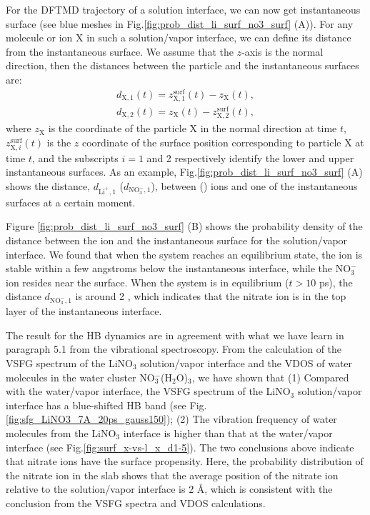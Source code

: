 For the DFTMD trajectory of a solution interface, we can now get instantaneous surface (see blue meshes in Fig.\thinspace\ref{fig:prob_dist_li_surf_no3_surf} (A)).
For any molecule or ion X in such a solution/vapor interface, we can define its distance from the instantaneous surface.
We assume that the $z$-axis is the normal direction, then the distances between the particle and the instantaneous surfaces are:
%
\begin{eqnarray}
    d_{\text{X},1}(t)=  z^\text{surf}_{\text{X},1}(t) - z_{\text{X}}(t),\label{eq:distance_particle2surf_1}\\
    d_{\text{X},2}(t)= z_{\text{X}}(t) - z^\text{surf}_{\text{X},2}(t), 
\label{eq:distance_particle2surf_2}
\end{eqnarray}
%
where $z_{\text{X}}$ is the coordinate of the particle X in the normal direction at time $t$, 
$z^\text{surf}_{\text{X},i}(t)$ is the $z$ coordinate of the surface position corresponding to particle X at time $t$, 
and the subscripts $i=1$ and 2 respectively identify the lower and upper instantaneous surfaces.
As an example, Fig.\thinspace\ref{fig:prob_dist_li_surf_no3_surf} (A) shows the distance, 
$d_{\text{Li}^+,1}$ ($d_{\text{NO}_3^-,1}$), between \Li (\nitrate) ions and one of the instantaneous surfaces at a certain moment.

Figure \ref{fig:prob_dist_li_surf_no3_surf} (B) shows the probability density of the distance between the ion 
and the instantaneous surface for the \LiN solution/vapor interface. We found that when the system reaches an equilibrium state, 
the \Li ion is stable within a few angstroms below the instantaneous interface, while the NO$^-_3$ ion resides near the surface. 
When the system is in equilibrium ($t>10$ ps), the distance $d_{\text{NO}_3^-,1}$ is around 2 \A, 
which indicates that the nitrate ion is in the top layer of the instantaneous interface. 

The result for the HB dynamics are in agreement with what we have learn in paragraph 5.1 
from the vibrational spectroscopy.
From the calculation of the VSFG spectrum of the LiNO$_3$ solution/vapor interface and the VDOS of water molecules in the water cluster NO$^-_3$(H$_2$O)$_3$,
we have shown that (1) Compared with the water/vapor interface, the VSFG spectrum of the LiNO$_3$ solution/vapor interface has a blue-shifted HB band 
(see Fig.\thinspace\ref{fig:sfg_LiNO3_7A_20ps_gauss150});
(2) The vibration frequency of water molecules from the LiNO$_3$ interface is higher than that at the water/vapor interface (see Fig.\thinspace\ref{fig:surf_x-vs-l_x_d1-5}).
The two conclusions above indicate that nitrate ions have the surface propensity. 
Here, the probability distribution of the nitrate ion in the slab shows that the average position of the nitrate ion relative to the solution/vapor interface is 2 \AA,
which is consistent with the conclusion from the VSFG spectra and VDOS calculations.
%

